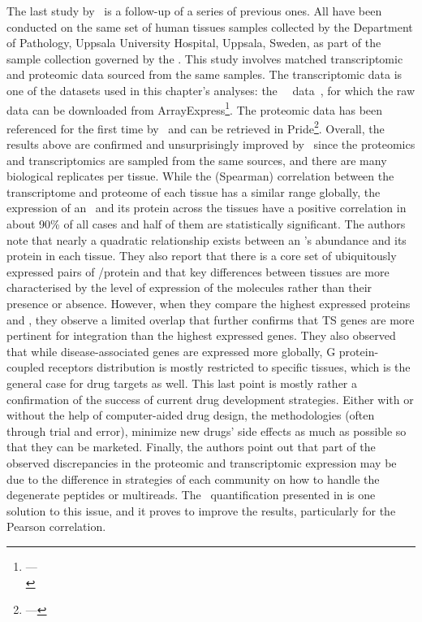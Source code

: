 The last study by~\citet{Wang2019-ut} is a follow-up of a series of previous ones.
All have been conducted on the same set of human tissues samples
collected by the Department of Pathology,
Uppsala University Hospital, Uppsala, Sweden,
as part of the sample collection governed by
the .
This study involves matched transcriptomic and proteomic data sourced
from the same samples.
The transcriptomic data is one of the datasets used in this chapter's analyses:
the \uhlen\ \etal\ data~,
for which the raw data can be downloaded from \gls{ArrayExpress}\footnote{%
---\\ }.
The proteomic data has been referenced for the first time by~\citet{Wang2019-ut}
and can be retrieved in \gls{Pride}\footnote{%
 ---
}.
Overall, the results above are confirmed and unsurprisingly improved by~\citet{Wang2019-ut}
since the proteomics and transcriptomics are sampled from the same sources,
and there are many biological replicates per tissue.
While the (Spearman) correlation
between the transcriptome and proteome of each tissue
has a similar range globally,
the expression of an \mRNA\ and its protein across the tissues have
a positive correlation in
about 90\% of all cases and half of them are statistically significant.
The authors note that nearly a quadratic relationship exists
between an \mRNA{}'s abundance and its protein in each tissue.
They also report that there is a core set of ubiquitously expressed pairs of
\mRNA/protein
and that key differences between tissues are more characterised
by the level of expression of the molecules rather than their presence or absence.
However, when they compare the highest expressed proteins and \mRNAs,
they observe a limited overlap that
further confirms that \gls{TS} genes are more pertinent for integration
than the highest expressed genes.
They also observed that while disease-associated genes are expressed more globally,
G protein-coupled receptors distribution is mostly restricted to specific tissues,
which is the general case for drug targets as well.
This last point is mostly rather a confirmation of the success
of current drug development strategies.
Either with or without the help of computer-aided drug design,
the methodologies
(often through trial and error),
minimize new drugs' side effects as much as possible
so that they can be marketed.
Finally, the authors point out that part of the observed discrepancies
in the proteomic and transcriptomic expression
may be due to the difference in strategies of each community
on how to handle the degenerate peptides or multireads.
The \PPKM\ quantification presented in 
is one solution to this issue,
and it proves to improve the results,
particularly for the Pearson correlation.

